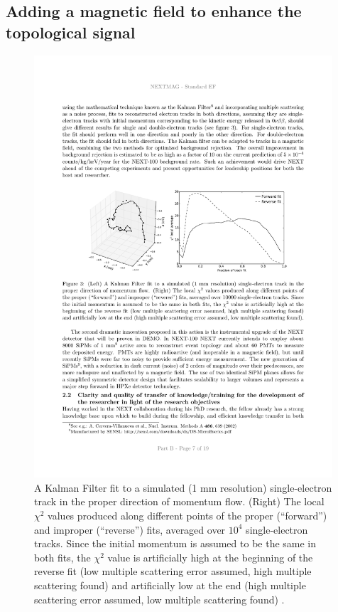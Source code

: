 \subsection{Adding a magnetic field to enhance the topological signal}

\begin{figure}
\centering
\includegraphics[width=0.99\textwidth]{img/KALMAN.pdf}
\caption{\small A Kalman Filter fit to a simulated (1 mm resolution) single-electron track in the proper direction of momentum flow. (Right) The local $\chi^2$ values produced along different points of the proper (“forward”) and improper (“reverse”) fits, averaged over $10^4$ single-electron tracks. Since the initial momentum is assumed to be the same in both fits, the $\chi^2$ value is artificially high at the beginning of the reverse fit (low multiple scattering error assumed, high multiple scattering found) and artificially low at the end (high multiple scattering error assumed, low multiple scattering found) .} \label{fig.KF}
\end{figure}

